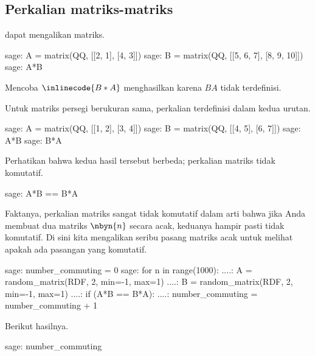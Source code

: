 \subsection{Perkalian matriks-matriks}
\Sage{} dapat mengalikan matriks.
\begin{sagecommandline}
sage: A = matrix(QQ, [[2, 1], [4, 3]])
sage: B = matrix(QQ, [[5, 6, 7], [8, 9, 10]]) 
sage: A*B
\end{sagecommandline}
Mencoba $\inlinecode{B*A}$ menghasilkan
 karena $BA$ tidak terdefinisi.

Untuk matriks persegi berukuran sama, perkalian terdefinisi dalam kedua urutan.
\begin{sagecommandline}
sage: A = matrix(QQ, [[1, 2], [3, 4]])
sage: B = matrix(QQ, [[4, 5], [6, 7]])
sage: A*B
sage: B*A
\end{sagecommandline}
Perhatikan bahwa kedua hasil tersebut berbeda;
perkalian matriks tidak komutatif.
\begin{sagecommandline}[d,0,2]
sage: A*B == B*A
\end{sagecommandline}

Faktanya, perkalian matriks sangat tidak komutatif dalam arti bahwa
jika Anda membuat dua matriks $\nbyn{n}$ secara acak,
keduanya hampir pasti tidak komutatif.
Di sini kita mengalikan seribu pasang matriks acak untuk melihat
apakah ada pasangan yang komutatif.
\begin{sagecommandline}
sage: number_commuting = 0 
sage: for n in range(1000):                                       
....:     A = random_matrix(RDF, 2, min=-1, max=1)
....:     B = random_matrix(RDF, 2, min=-1, max=1)
....:     if (A*B == B*A):
....:         number_commuting = number_commuting + 1 
\end{sagecommandline}
Berikut hasilnya.
\begin{sagecommandline}
sage: number_commuting
\end{sagecommandline}

 


